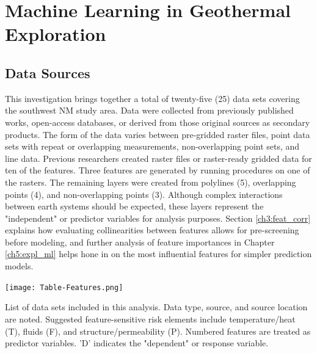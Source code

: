 \chapter{Machine Learning in Geothermal Exploration}\label{ch3:expl_prep}

\section{Data Sources}\label{ch3:expl_data_src}

This investigation brings together a total of twenty-five (25) data sets covering the southwest NM study area. Data were collected from previously published works, open-access databases, or derived from those original sources as secondary products. The form of the data varies between pre-gridded raster files, point data sets with repeat or overlapping measurements, non-overlapping point sets, and line data. Previous researchers created raster files or raster-ready gridded data for ten of the features. Three features are generated by running procedures on one of the rasters. The remaining layers were created from polylines (5), overlapping points (4), and non-overlapping points (3). Although complex interactions between earth systems should be expected, these layers represent the "independent" or predictor variables for analysis purposes. Section \ref{ch3:feat_corr} explains how evaluating collinearities between features allows for pre-screening before modeling, and further analysis of feature importances in Chapter \ref{ch5:expl_ml} helps hone in on the most influential features for simpler prediction models.

\begin{table}[htp]
\centering
\texttt{[image: Table-Features.png]}
\caption[Southwestern New Mexico features list]{List of data sets included in this analysis. Data type, source, and source location are noted. Suggested feature-sensitive risk elements include temperature/heat (T), fluids (F), and structure/permeability (P). Numbered features are treated as predictor variables. 'D' indicates the "dependent" or response variable.}
\label{tab:features}
\end{table}


